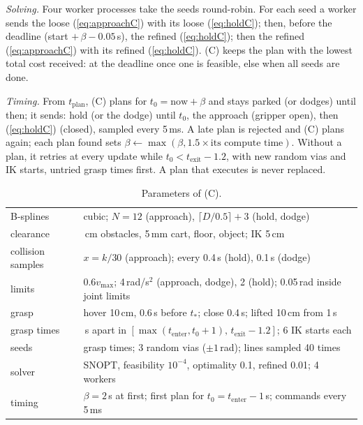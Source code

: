 \documentclass[conference]{IEEEtran}
\begin{document}
\emph{Solving.} Four worker processes take the seeds round-robin. For each seed a worker sends the loose
(\ref{eq:approachC}) with its loose (\ref{eq:holdC}); then, before the deadline (start $+\,\beta-0.05$\,s), the
refined (\ref{eq:holdC}); then the refined (\ref{eq:approachC}) with its refined (\ref{eq:holdC}). (C) keeps the plan
with the lowest total cost received: at the deadline once one is feasible, else when all seeds are done.

\emph{Timing.} From $t_{\text{plan}}$, (C) plans for $t_0=\text{now}+\beta$ and stays parked (or dodges) until then;
it sends: hold (or the dodge) until $t_0$, the approach (gripper open), then (\ref{eq:holdC}) (closed), sampled every
5\,ms. A late plan is rejected and (C) plans again; each plan found sets $\beta\gets\max(\beta,1.5\times\text{its
compute time})$. Without a plan, it retries at every update while $t_0<t_{\text{exit}}-1.2$, with new random vias and
IK starts, untried grasp times first. A plan that executes is never replaced.

\begin{table}[!t]
  \centering
  \caption{Parameters of (C).}
  \label{tab:paramsC}
  \footnotesize\setlength{\tabcolsep}{3pt}
  \begin{tabular}{@{}>{\raggedright\arraybackslash}p{}>{\raggedright\arraybackslash}p{}@{}}
    \toprule
    B-splines & cubic; $N=12$ (approach), $\lceil D/0.5\rceil+3$ (hold, dodge) \\
    clearance & 4\,cm obstacles, 5\,mm cart, floor, object; IK 5\,cm \\
    collision samples & $x=k/30$ (approach); every 0.4\,s (hold), 0.1\,s (dodge) \\
    limits & $0.6v_{\max}$; 4\,rad/s$^2$ (approach, dodge), 2 (hold); 0.05\,rad inside joint limits \\
    grasp & hover 10\,cm, 0.6\,s before $t_*$; close 0.4\,s; lifted 10\,cm from 1\,s \\
    grasp times & 0.5\,s apart in $[\max(t_{\text{enter}},t_0+1),\,t_{\text{exit}}-1.2]$; 6 IK starts each \\
    seeds & 3 grasp times; 3 random vias ($\pm1$\,rad); lines sampled 40 times \\
    solver & SNOPT, feasibility $10^{-4}$, optimality 0.1, refined 0.01; 4 workers \\
    timing & $\beta=2$\,s at first; first plan for $t_0=t_{\text{enter}}-1$\,s; commands every 5\,ms \\
    \bottomrule
  \end{tabular}
\end{table}
\end{document}
